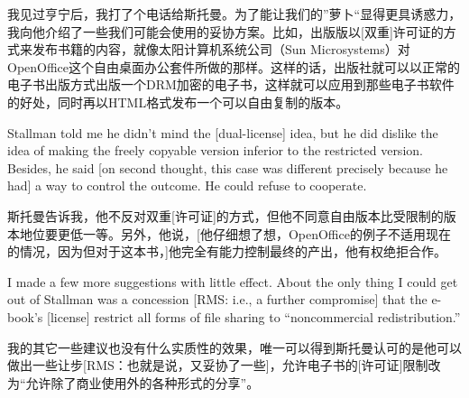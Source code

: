 \ifdefined\chs
我见过亨宁后，我打了个电话给斯托曼。为了能让我们的”萝卜“显得更具诱惑力，我向他介绍了一些我们可能会使用的妥协方案。比如，出版版以[双重]许可证的方式来发布书籍的内容，就像太阳计算机系统公司（Sun Microsystems）对OpenOffice这个自由桌面办公套件所做的那样。这样的话，出版社就可以以正常的电子书出版方式出版一个DRM加密的电子书，这样就可以应用到那些电子书软件的好处，同时再以HTML格式发布一个可以自由复制的版本。
\fi

\ifdefined\eng
Stallman told me he didn't mind the [dual-license] idea, but he did dislike the idea of making the freely copyable version inferior to the restricted version. Besides, he said [on second thought, this case was different precisely because he had] a way to control the outcome. He could refuse to cooperate.
\fi

\ifdefined\chs
斯托曼告诉我，他不反对双重[许可证]的方式，但他不同意自由版本比受限制的版本地位要更低一等。另外，他说，[他仔细想了想，OpenOffice的例子不适用现在的情况，因为但对于这本书，]他完全有能力控制最终的产出，他有权绝拒合作。
\fi

\ifdefined{}
\fi

\ifdefined{}
\fi

\ifdefined\eng
I made a few more suggestions with little effect. About the only thing I could get out of Stallman was a concession [RMS: i.e., a further compromise] that the e-book's  [license] restrict all forms of file sharing to ``noncommercial redistribution.''
\fi

\ifdefined\chs
我的其它一些建议也没有什么实质性的效果，唯一可以得到斯托曼认可的是他可以做出一些让步[RMS：也就是说，又妥协了一些]，允许电子书的[许可证]限制改为“允许除了商业使用外的各种形式的分享”。
\fi

